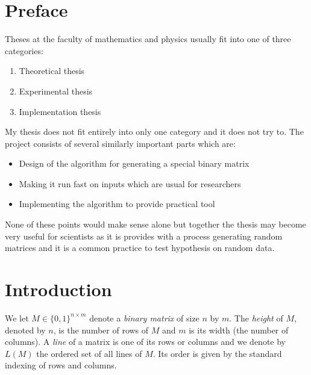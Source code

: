 \chapter*{Preface}
Theses at the faculty of mathematics and physics usually fit into one of three categories:
\begin{enumerate}
\item Theoretical thesis
\item Experimental thesis
\item Implementation thesis
\end{enumerate}
My thesis does not fit entirely into only one category and it does not try to. The project consists of several similarly important parts which are:
\begin{itemize}
\item Design of the algorithm for generating a special binary matrix
\item Making it run fast on inputs which are usual for researchers
\item Implementing the algorithm to provide practical tool
\end{itemize}
None of these points would make sense alone but together the thesis may become very useful for scientists as it is provides with a process generating random matrices and it is a common practice to test hypothesis on random data.
\chapter*{Introduction}
We let $M\in\{0,1\}^{n\times m}$ denote a \emph{binary matrix} of size $n$ by $m$. The \emph{height} of $M$, denoted by $n$, is the number of rows of $M$ and $m$ is its width (the number of columns). A \emph{line} of a matrix is one of its rows or columns and we denote by $L(M)$ the ordered set of all lines of $M$. Its order is given by the standard indexing of rows and columns.

